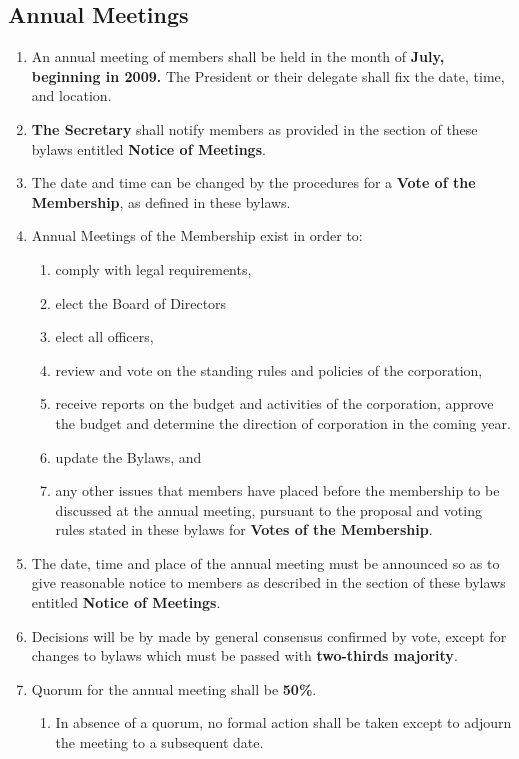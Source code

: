 \documentclass{article}
\begin{document}
\subsection{Annual Meetings}
\begin{enumerate}
    \item An annual meeting of members shall be held in the month of \textbf{July,
    beginning in 2009.} The President or their delegate shall fix the date, time,
    and location.
    \item \textbf{The Secretary} shall notify members as provided in the section
    of these bylaws entitled \textbf{Notice of Meetings}.
    \item The date and time can be changed by the procedures for a \textbf{Vote
    of the Membership}, as defined in these bylaws.
    \item Annual Meetings of the Membership exist in order to:
    \begin{enumerate}
        \item comply with legal requirements,
        \item elect the Board of Directors
        \item elect all officers,
        \item review and vote on the standing rules and policies of the
        corporation,
        \item receive reports on the budget and activities of the corporation,
        approve the budget and determine the direction of corporation in the
        coming year.
        \item update the Bylaws, and
        \item any other issues that members have placed before the membership
        to be discussed at the annual meeting, pursuant to the proposal and
        voting rules stated in these bylaws for \textbf{Votes of the Membership}.
    \end{enumerate}
    \item The date, time and place of the annual meeting must be announced so as
    to give reasonable notice to members as described in the section of these
    bylaws entitled \textbf{Notice of Meetings}.
    \item Decisions will be by made by general consensus confirmed by vote,
    except for changes to bylaws which must be passed with \textbf{two-thirds majority}.
    \item Quorum for the annual meeting shall be \textbf{50\%}.
    \begin{enumerate}
        \item In absence of a quorum, no formal action shall be taken except to
        adjourn the meeting to a subsequent date.
    \end{enumerate}
\end{enumerate}
\end{document}
